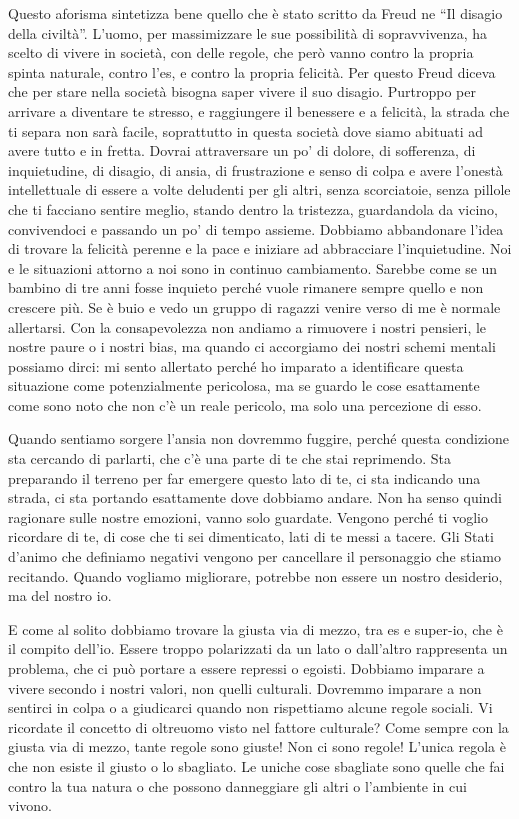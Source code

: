 \documentclass[12pt]{book} %
\begin{document}
Questo aforisma sintetizza bene quello che è stato scritto da Freud ne “Il disagio della civiltà”.
L'uomo, per massimizzare le sue possibilità di sopravvivenza, ha scelto di vivere in società, con
delle regole, che però vanno contro la propria spinta naturale, contro l'es, e contro la propria
felicità. Per questo Freud diceva che per stare nella società bisogna saper vivere il suo disagio. Purtroppo per
arrivare a diventare te stresso, e raggiungere il benessere e a felicità, la strada che ti separa non sarà facile,
soprattutto in questa società dove siamo abituati ad avere tutto e in fretta. Dovrai attraversare un
po' di dolore, di sofferenza, di inquietudine, di disagio, di ansia, di frustrazione e senso di
colpa e avere l'onestà intellettuale di essere a volte deludenti per gli altri, senza scorciatoie,
senza pillole che ti facciano sentire meglio, stando dentro la tristezza, guardandola da vicino, convivendoci e
passando un po' di tempo assieme. Dobbiamo abbandonare l'idea di trovare la felicità perenne e la pace e iniziare ad
abbracciare l'inquietudine. Noi e le situazioni attorno a noi sono in continuo cambiamento. Sarebbe come se un bambino
di tre anni fosse inquieto perché vuole rimanere sempre quello e non crescere più. Se è buio e vedo un gruppo di
ragazzi venire verso di me è normale allertarsi. Con la consapevolezza non andiamo a rimuovere i nostri pensieri, le
nostre paure o i nostri bias, ma quando ci accorgiamo dei nostri schemi mentali possiamo dirci: mi sento allertato
perché ho imparato a identificare questa situazione come potenzialmente pericolosa, ma se guardo le cose esattamente
come sono noto che non c'è un reale pericolo, ma solo una percezione di esso.

Quando sentiamo sorgere l'ansia non dovremmo fuggire, perché questa condizione sta cercando di
parlarti, che c'è una parte di te che stai reprimendo. Sta preparando il terreno per far emergere
questo lato di te, ci sta indicando una strada, ci sta portando esattamente dove dobbiamo andare. Non ha senso quindi
ragionare sulle nostre emozioni, vanno solo guardate. Vengono perché ti voglio ricordare di te, di cose che ti sei
dimenticato, lati di te messi a tacere. Gli Stati d'animo che definiamo negativi vengono per cancellare il personaggio
che stiamo recitando. Quando vogliamo migliorare, potrebbe non essere un nostro desiderio, ma del nostro io.

E come al solito dobbiamo trovare la giusta via di mezzo, tra es e super-io, che è il compito
dell'io. Essere troppo polarizzati da un lato o dall'altro rappresenta un
problema, che ci può portare a essere repressi o egoisti. Dobbiamo imparare a vivere secondo i nostri valori, non
quelli culturali. Dovremmo imparare a non sentirci in colpa o a giudicarci quando non rispettiamo alcune regole
sociali. Vi ricordate il concetto di oltreuomo visto nel fattore culturale? Come sempre con la giusta via di mezzo,
tante regole sono giuste! Non ci sono regole! L'unica regola è che non esiste il giusto o lo
sbagliato. Le uniche cose sbagliate sono quelle che fai contro la tua natura o che possono danneggiare gli altri o
l'ambiente in cui vivono. 
\end{document}
